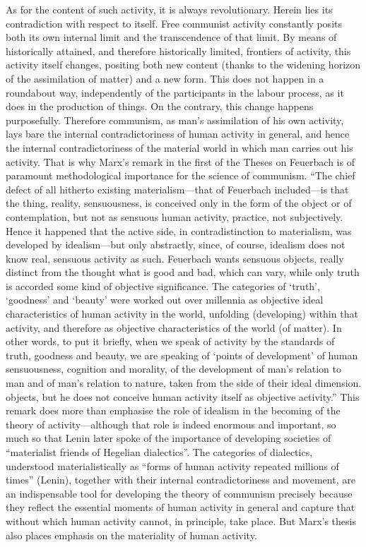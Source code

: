 \documentclass[../main]{subfiles}
\begin{document}
As for the content of such activity, it is always revolutionary. Herein lies its contradiction with respect to itself. Free communist activity constantly posits both its own internal limit and the transcendence of that limit. By means of historically attained, and therefore historically limited, frontiers of activity, this activity itself changes, positing both new content (thanks to the widening horizon of the assimilation of matter) and a new form. This does not happen in a roundabout way, independently of the participants in the labour process, as it does in the production of things. On the contrary, this change happens purposefully. Therefore communism, as man’s assimilation of his own activity, lays bare the internal contradictoriness of human activity in general, and hence the internal contradictoriness of the material world in which man carries out his activity. That is why Marx’s remark in the first of the Theses on Feuerbach is of paramount methodological importance for the science of communism. “The chief defect of all hitherto existing materialism—that of Feuerbach included—is that the thing, reality, sensuousness, is conceived only in the form of the object or of contemplation, but not as sensuous human activity, practice, not subjectively. Hence it happened that the active side, in contradistinction to materialism, was developed by idealism—but only abstractly, since, of course, idealism does not know real, sensuous activity as such. Feuerbach wants sensuous objects, really distinct from the thought what is good and bad, which can vary, while only truth is accorded some kind of objective significance. The categories of ‘truth’, ‘goodness’ and ‘beauty’ were worked out over millennia as objective ideal characteristics of human activity in the world, unfolding (developing) within that activity, and therefore as objective characteristics of the world (of matter). In other words, to put it briefly, when we speak of activity by the standards of truth, goodness and beauty, we are speaking of ‘points of development’ of human sensuousness, cognition and morality, of the development of man’s relation to man and of man’s relation to nature, taken from the side of their ideal dimension. objects, but he does not conceive human activity itself as objective activity.” This remark does more than emphasise the role of idealism in the becoming of the theory of activity—although that role is indeed enormous and important, so much so that Lenin later spoke of the importance of developing societies of “materialist friends of Hegelian dialectics”. The categories of dialectics, understood materialistically as “forms of human activity repeated millions of times” (Lenin), together with their internal contradictoriness and movement, are an indispensable tool for developing the theory of communism precisely because they reflect the essential moments of human activity in general and capture that without which human activity cannot, in principle, take place. But Marx’s thesis also places emphasis on the materiality of human activity.
\end{document}
